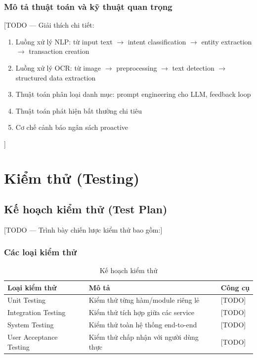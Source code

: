 \subsubsection{Mô tả thuật toán và kỹ thuật quan trọng}
[TODO --- Giải thích chi tiết:
\begin{enumerate}
    \item Luồng xử lý NLP: từ input text $\rightarrow$ intent classification $\rightarrow$ entity extraction $\rightarrow$ transaction creation
    \item Luồng xử lý OCR: từ image $\rightarrow$ preprocessing $\rightarrow$ text detection $\rightarrow$ structured data extraction
    \item Thuật toán phân loại danh mục: prompt engineering cho LLM, feedback loop
    \item Thuật toán phát hiện bất thường chi tiêu
    \item Cơ chế cảnh báo ngân sách proactive
\end{enumerate}
]

\section{Kiểm thử (Testing)}
\label{sec:testing}

\subsection{Kế hoạch kiểm thử (Test Plan)}
\label{subsec:test_plan}

[TODO --- Trình bày chiến lược kiểm thử bao gồm:]

\subsubsection{Các loại kiểm thử}

\begin{table}[htbp]
\centering
\begin{tabularx}{\textwidth}{|l|X|l|}
\hline
\textbf{Loại kiểm thử} & \textbf{Mô tả} & \textbf{Công cụ} \\ \hline
Unit Testing & Kiểm thử từng hàm/module riêng lẻ & [TODO] \\ \hline
Integration Testing & Kiểm thử tích hợp giữa các service & [TODO] \\ \hline
System Testing & Kiểm thử toàn hệ thống end-to-end & [TODO] \\ \hline
User Acceptance Testing & Kiểm thử chấp nhận với người dùng thực & [TODO] \\ \hline
\end{tabularx}
\caption{Kế hoạch kiểm thử}
\label{tab:test_plan}
\end{table}

